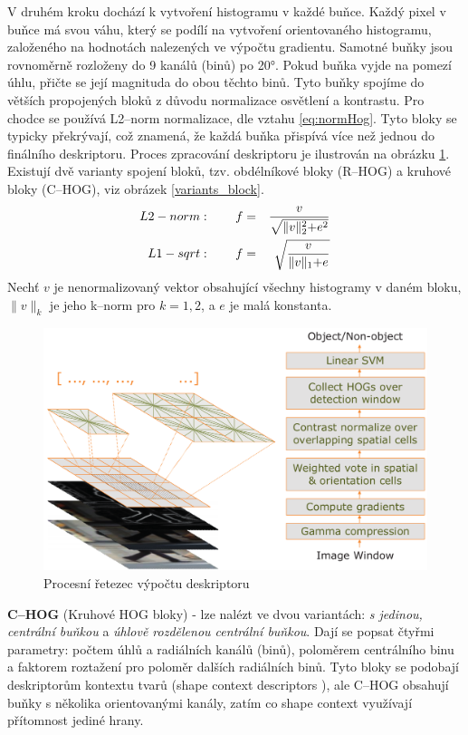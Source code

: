 V druhém kroku dochází k vytvoření histogramu v každé buňce. Každý pixel v buňce má svou váhu, který se podílí na vytvoření orientovaného histogramu, založeného na hodnotách nalezených ve výpočtu gradientu. Samotné buňky jsou rovnoměrně rozloženy do 9 kanálů (binů) po \ang{20}. Pokud buňka vyjde na pomezí úhlu, přičte se její magnituda do obou těchto binů.
Tyto buňky spojíme do větších propojených bloků z důvodu normalizace osvětlení a kontrastu. Pro chodce se používá L2--norm normalizace, dle vztahu \eqref{eq:normHog}. Tyto bloky se typicky překrývají, což znamená, že každá buňka přispívá více než jednou do finálního deskriptoru. Proces zpracování deskriptoru je ilustrován na obrázku \ref{hog_chain}. Existují dvě varianty spojení bloků, tzv. obdélníkové bloky (R--HOG) a kruhové bloky (C--HOG), viz obrázek \ref{variants_block}.  
\begin{equation}
\centering
 \label{eq:normHog}
 \begin{aligned}
L2-norm&: \qquad  f =& \frac{v}{\sqrt{\lVert v \lVert_2^2 + e^2}} \\
L1-sqrt&: \qquad  f =& \sqrt{\frac{v}{\lVert v \lVert_1 + e}}
 \end{aligned}
\end{equation}
Nechť $v$ je nenormalizovaný vektor obsahující všechny histogramy v daném bloku, $\lVert v \lVert_k$ je jeho k--norm pro $k = 1,2$, a $e$ je malá konstanta.
 \begin{figure}[H]
\centering
\includegraphics[width=16cm]{figures/hog_pipeline}
\caption{Procesní řetezec výpočtu deskriptoru \cite{hog:dalal}}
\label{hog_chain}
\end{figure}

\textbf{C--HOG} (Kruhové HOG bloky) - lze nalézt ve dvou variantách: \textit{s jedinou, centrální buňkou} a \textit{úhlově rozdělenou centrální buňkou}. Dají se popsat čtyřmi parametry: počtem úhlů a radiálních kanálů (binů), poloměrem centrálního binu a faktorem roztažení pro poloměr dalších radiálních binů.  Tyto bloky se podobají deskriptorům kontextu tvarů (shape context descriptors \cite{shapeContext}), ale C--HOG obsahují buňky s několika orientovanými kanály, zatím co shape context využívají přítomnost jediné hrany.


